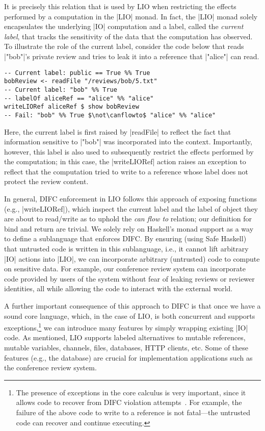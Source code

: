 It is precisely this relation that is used by LIO when restricting the
effects performed by a computation in the \hs|LIO| monad.
%
In fact, the \hs|LIO| monad solely encapsulates the underlying
\hs|IO| computation and a label, called the \emph{current label}, that
tracks the sensitivity of the data that the computation has observed.
%
To illustrate the role of the current label, consider the code below
that reads \hs|"bob"|'s private review and tries to leak it into a
reference that \hs|"alice"| can read.
\begin{verbatim}
-- Current label: public == True %% True
bobReview <- readFile "/reviews/bob/5.txt"
-- Current label: "bob" %% True
-- labelOf aliceRef == "alice" %% "alice"
writeLIORef aliceRef $ show bobReview
-- Fail: "bob" %% True $\not\canflowto$ "alice" %% "alice"
\end{verbatim}
%
Here, the current label is first raised by \hs|readFile| to reflect
the fact that information sensitive to \hs|"bob"| was incorporated
into the context.
%
Importantly, however, this label is also used to subsequently restrict
the effects performed by the computation; in this case, the
\hs|writeLIORef| action raises an exception to reflect that
the computation tried to write to a reference whose label
does not protect the review content.

In general, DIFC enforcement in LIO follows this approach of exposing
functions (e.g., \hs|writeLIORef|), which inspect the current label
and the label of object they are about to read/write as to uphold the
\emph{can flow to} relation; our definition for bind and return are trivial.
%
We solely rely on Haskell's monad support as a way to define a
sublanguage that enforces DIFC.
%
By ensuring (using Safe Haskell) that untrusted code is written in
this sublanguage, i.e., it cannot lift arbitrary \hs|IO| actions into
\hs|LIO|, we can incorporate arbitrary (untrusted) code to compute on
sensitive data.
%
For example, our conference review system can incorporate code
provided by users of the system without fear of leaking reviews or
reviewer identities, all while allowing the code to interact with the
external world.

A further important consequence of this approach to DIFC is that once
we have a sound core language, which, in the case of LIO, is both
concurrent and supports exceptions,\footnote{
  The presence of exceptions in the core calculus is very important,
  since it allows code to recover from DIFC violation
  attempts~\cite{Breeze, stefan:2012:arxiv-flexible}.
  For example, the failure of the above code to write to a reference
  is not fatal---the untrusted code can recover and continue
  executing.
  
}
we can introduce many features by simply wrapping existing \hs|IO|
code.
%
As mentioned, LIO supports labeled alternatives to mutable references,
mutable variables, channels, files, databases, HTTP clients, etc.
%
Some of these features (e.g., the database) are crucial for
implementation applications such as the conference review system.

